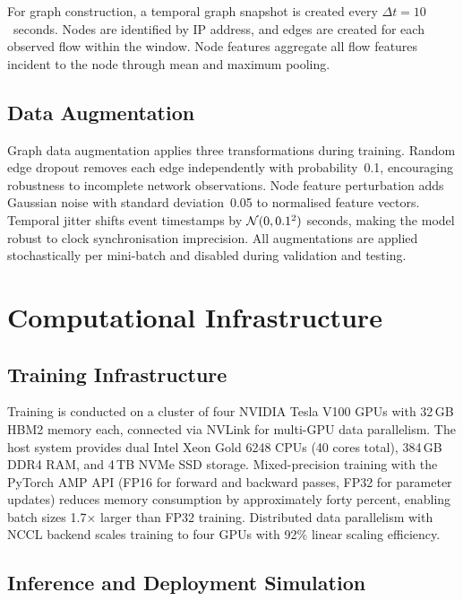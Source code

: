 For graph construction, a temporal graph snapshot is created every $\Delta t=10$~seconds. Nodes are identified by IP address, and edges are created for each observed flow within the window. Node features aggregate all flow features incident to the node through mean and maximum pooling.


\subsection{Data Augmentation}
\label{app:augmentation}

Graph data augmentation applies three transformations during training. Random edge dropout removes each edge independently with probability~0.1, encouraging robustness to incomplete network observations. Node feature perturbation adds Gaussian noise with standard deviation~0.05 to normalised feature vectors. Temporal jitter shifts event timestamps by $\mathcal{N}(0,0.1^2)$ seconds, making the model robust to clock synchronisation imprecision. All augmentations are applied stochastically per mini-batch and disabled during validation and testing.


\section{Computational Infrastructure}
\label{app:infrastructure}

\subsection{Training Infrastructure}
\label{app:training_infra}

Training is conducted on a cluster of four NVIDIA Tesla V100 GPUs with 32\,GB HBM2 memory each, connected via NVLink for multi-GPU data parallelism. The host system provides dual Intel Xeon Gold 6248 CPUs (40 cores total), 384\,GB DDR4 RAM, and 4\,TB NVMe SSD storage. Mixed-precision training with the PyTorch AMP API (FP16 for forward and backward passes, FP32 for parameter updates) reduces memory consumption by approximately forty percent, enabling batch sizes 1.7$\times$ larger than FP32 training. Distributed data parallelism with NCCL backend scales training to four GPUs with 92\% linear scaling efficiency.


\subsection{Inference and Deployment Simulation}
\label{app:inference_opt}

